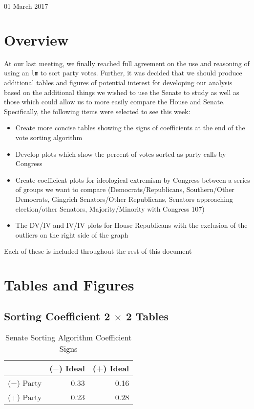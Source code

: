 \documentclass[12pt]{article}
\begin{document}
	
\begin{center}
	\Large 01 March 2017
\end{center}

\section{Overview}

At our last meeting, we finally reached full agreement on the use and reasoning of using an \verb|lm| to sort party votes. Further, it was decided that we should produce additional tables and figures of potential interest for developing our analysis based on the additional things we wished to use the Senate to study as well as those which could allow us to more easily compare the House and Senate. Specifically, the following items were selected to see this week:

\begin{itemize}
	\item Create more concise tables showing the signs of coefficients at the end of the vote sorting algorithm
	
	\item Develop plots which show the percent of votes sorted as party calls by Congress
	
	\item Create coefficient plots for ideological extremism by Congress between a series of groups we want to compare (Democrats/Republicans, Southern/Other Democrats, Gingrich Senators/Other Republicans, Senators approaching election/other Senators, Majority/Minority with Congress 107)
	
	\item The DV/IV and IV/IV plots for House Republicans with the exclusion of the outliers on the right side of the graph
\end{itemize}

\noindent
Each of these is included throughout the rest of this document
	
\section{Tables and Figures}
	
\subsection{Sorting Coefficient 2 $ \times $ 2 Tables}

\begin{table}[ht]
	\centering
	\caption{Senate Sorting Algorithm Coefficient Signs}
	\begin{tabular}{rrr}
		\hline
		& ($-$) Ideal & (+) Ideal \\ 
		\hline
		($-$) Party & 0.33 & 0.16 \\ 
		(+) Party & 0.23 & 0.28 \\ 
		\hline
	\end{tabular}
\end{table}
\end{document}
